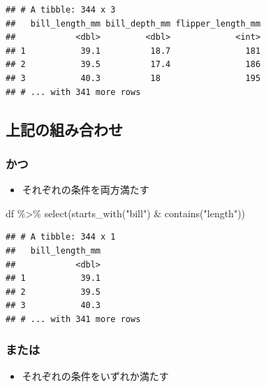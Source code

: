 \documentclass[
  xelatex,ja=standard, b5paper]{bxjsbook}
\newenvironment{Shaded}{\begin{snugshade}}{\end{snugshade}}
\newcommand{\FunctionTok}[1]{\textcolor[rgb]{0.00,0.00,0.00}{#1}}
\newcommand{\NormalTok}[1]{#1}
\newcommand{\SpecialCharTok}[1]{\textcolor[rgb]{0.00,0.00,0.00}{#1}}
\newcommand{\StringTok}[1]{\textcolor[rgb]{0.31,0.60,0.02}{#1}}
\providecommand{\tightlist}{%
  \setlength{\itemsep}{0pt}\setlength{\parskip}{0pt}}
\begin{document}
\begin{verbatim}
## # A tibble: 344 x 3
##   bill_length_mm bill_depth_mm flipper_length_mm
##            <dbl>         <dbl>             <int>
## 1           39.1          18.7               181
## 2           39.5          17.4               186
## 3           40.3          18                 195
## # ... with 341 more rows
\end{verbatim}

\hypertarget{select-helper5}{%
\subsection{上記の組み合わせ}\label{select-helper5}}

\hypertarget{select-helper5-1}{%
\subsubsection{かつ}\label{select-helper5-1}}

\begin{itemize}
\tightlist
\item
  それぞれの条件を両方満たす
\end{itemize}

\begin{Shaded}
\begin{Highlighting}[]
\NormalTok{df }\SpecialCharTok{\%\textgreater{}\%}
  \FunctionTok{select}\NormalTok{(}\FunctionTok{starts\_with}\NormalTok{(}\StringTok{"bill"}\NormalTok{) }\SpecialCharTok{\&} \FunctionTok{contains}\NormalTok{(}\StringTok{"length"}\NormalTok{))}
\end{Highlighting}
\end{Shaded}

\begin{verbatim}
## # A tibble: 344 x 1
##   bill_length_mm
##            <dbl>
## 1           39.1
## 2           39.5
## 3           40.3
## # ... with 341 more rows
\end{verbatim}

\hypertarget{select-helper5-2}{%
\subsubsection{または}\label{select-helper5-2}}

\begin{itemize}
\tightlist
\item
  それぞれの条件をいずれか満たす
\end{itemize}
\end{document}
